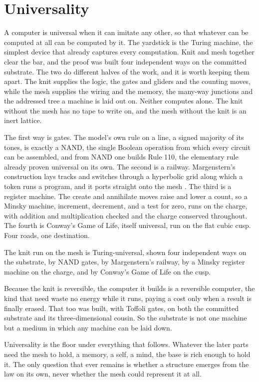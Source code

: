 \section{Universality}

A computer is universal when it can imitate any other, so that whatever can be computed at all can be computed by it. The yardstick is the Turing machine, the simplest device that already captures every computation. Knit and mesh together clear the bar, and the proof was built four independent ways on the committed substrate. The two do different halves of the work, and it is worth keeping them apart. The knit supplies the logic, the gates and gliders and the counting moves, while the mesh supplies the wiring and the memory, the many-way junctions and the addressed tree a machine is laid out on. Neither computes alone. The knit without the mesh has no tape to write on, and the mesh without the knit is an inert lattice.

The first way is gates. The model's own rule on a line, a signed majority of its tones, is exactly a NAND, the single Boolean operation from which every circuit can be assembled, and from NAND one builds Rule 110, the elementary rule already proven universal on its own. The second is a railway. Margenstern's construction lays tracks and switches through a hyperbolic grid along which a token runs a program, and it ports straight onto the mesh \cite{margenstern2008}. The third is a register machine. The create and annihilate moves raise and lower a count, so a Minsky machine, increment, decrement, and a test for zero, runs on the charge, with addition and multiplication checked and the charge conserved throughout. The fourth is Conway's Game of Life, itself universal, run on the flat cubic cusp. Four roads, one destination.

\begin{result}
The knit run on the mesh is Turing-universal, shown four independent ways on the substrate, by NAND gates, by Margenstern's railway, by a Minsky register machine on the charge, and by Conway's Game of Life on the cusp. \cite{pollard2026vibetest}
\end{result}

Because the knit is reversible, the computer it builds is a reversible computer, the kind that need waste no energy while it runs, paying a cost only when a result is finally erased. That too was built, with Toffoli gates, on both the committed substrate and its three-dimensional cousin. So the substrate is not one machine but a medium in which any machine can be laid down.

Universality is the floor under everything that follows. Whatever the later parts need the mesh to hold, a memory, a self, a mind, the base is rich enough to hold it. The only question that ever remains is whether a structure emerges from the law on its own, never whether the mesh could represent it at all.
